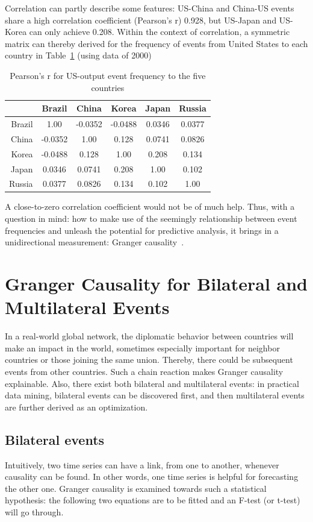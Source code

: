 \documentclass[runningheads,a4paper]{llncs}
\begin{document}
Correlation can partly describe some features: US-China and China-US events share a high correlation coefficient (Pearson's r) 0.928, but US-Japan and US-Korea can only achieve 0.208. Within the context of correlation, a symmetric matrix can thereby derived for the frequency of events from United States to each country in Table~\ref{tab:1} (using data of 2000)

\begin{table}
\caption{Pearson's r for US-output event frequency to the five countries}
\centering
\begin{tabular}{r c c c c c}
\hline\hline
{ } &  Brazil & China & Korea & Japan & Russia \\
\hline
Brazil  & 1.00 &  -0.0352 & -0.0488 & 0.0346 & 0.0377 \\
\hline
China  & -0.0352  & 1.00  &  0.128 &  0.0741 &  0.0826  \\
\hline
Korea  &  -0.0488  &  0.128  &  1.00  & 0.208 & 0.134  \\
\hline
Japan  &  0.0346  &  0.0741 &  0.208 &  1.00  & 0.102 \\
\hline
Russia  &  0.0377   &  0.0826 &  0.134 &  0.102  & 1.00 \\
\hline\hline
\end{tabular}
\label{tab:1}
\end{table}

A close-to-zero correlation coefficient would not be of much help. Thus, with a question in mind: how to make use of the seemingly relationship between event frequencies and unleash the potential for predictive analysis, it brings in a unidirectional measurement: Granger causality~\cite{granger1969}. 

\section{Granger Causality for Bilateral and Multilateral Events}
\label{granger}

In a real-world global network, the diplomatic behavior between countries will make an impact in the world, sometimes especially important for  neighbor countries or those joining the same union. Thereby, there could be subsequent events from other countries. Such a chain reaction makes Granger causality explainable. Also, there exist both bilateral and multilateral events: in practical data mining, bilateral events can be discovered first, and then multilateral events are further derived as an optimization.

\subsection{Bilateral events}
Intuitively, two time series can have a link, from one to another, whenever causality can be found. In other words, one time series is helpful for forecasting the other one. Granger causality is examined towards such a statistical hypothesis: the following two equations are to be fitted and an F-test (or t-test) will go through. 
\end{document}
